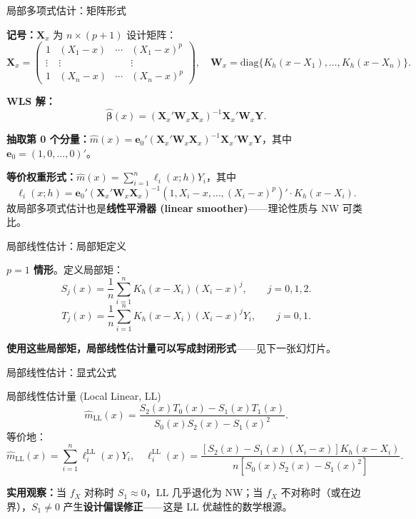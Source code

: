 \documentclass[aspectratio=169, 10pt]{beamer}
\begin{document}
\begin{frame}{局部多项式估计：矩阵形式}

  \textbf{记号：}$\mathbf{X}_x$ 为 $n\times(p+1)$ 设计矩阵：
  \[
    \mathbf{X}_x = \begin{pmatrix}
      1 & (X_1-x) & \cdots & (X_1-x)^p \\
      \vdots & \vdots & & \vdots \\
      1 & (X_n-x) & \cdots & (X_n-x)^p
    \end{pmatrix},\quad
    \mathbf{W}_x = \text{diag}\{K_h(x-X_1),\ldots,K_h(x-X_n)\}.
  \]

  \textbf{WLS 解：}
  \[
    \boxed{\;\hat{\boldsymbol{\beta}}(x) = (\mathbf{X}_x'\mathbf{W}_x \mathbf{X}_x)^{-1}\mathbf{X}_x'\mathbf{W}_x \mathbf{Y}.\;}
  \]

  \textbf{抽取第 0 个分量：}$\hat m(x) = \mathbf{e}_0'(\mathbf{X}_x'\mathbf{W}_x \mathbf{X}_x)^{-1}\mathbf{X}_x'\mathbf{W}_x \mathbf{Y}$，其中 $\mathbf{e}_0 = (1,0,\ldots,0)'$。

  \begin{keybox}
    \textbf{等价权重形式：}$\hat m(x) = \sum_{i=1}^n \ell_i(x; h) Y_i$，其中
    \[
      \ell_i(x;h) = \mathbf{e}_0'(\mathbf{X}_x'\mathbf{W}_x \mathbf{X}_x)^{-1}(1, X_i-x, \ldots, (X_i-x)^p)'\cdot K_h(x-X_i).
    \]
    故局部多项式估计也是\textbf{线性平滑器 (linear smoother)}——理论性质与 NW 可类比。
  \end{keybox}

\end{frame}


\begin{frame}{局部线性估计：局部矩定义}

  \textbf{$p=1$ 情形}。定义局部矩：
  \[
    S_j(x) = \frac{1}{n}\sum_{i=1}^n K_h(x-X_i)(X_i-x)^j,\qquad j=0,1,2.
  \]
  \[
    T_j(x) = \frac{1}{n}\sum_{i=1}^n K_h(x-X_i)(X_i-x)^j Y_i,\qquad j=0,1.
  \]

  \textbf{使用这些局部矩，局部线性估计量可以写成封闭形式}——见下一张幻灯片。

\end{frame}


\begin{frame}{局部线性估计：显式公式}

  \begin{definitionbox}{{局部线性估计量 (Local Linear, LL)}}
    \[
      \hat m_{\text{LL}}(x) = \frac{S_2(x) T_0(x) - S_1(x) T_1(x)}{S_0(x) S_2(x) - S_1(x)^2}.
    \]
    等价地：
    \[
      \hat m_{\text{LL}}(x) = \sum_{i=1}^n \ell_i^{\text{LL}}(x) Y_i,\quad
      \ell_i^{\text{LL}}(x) = \frac{[S_2(x) - S_1(x)(X_i-x)] K_h(x-X_i)}{n[S_0(x) S_2(x) - S_1(x)^2]}.
    \]
  \end{definitionbox}

  \begin{keybox}
    \textbf{实用观察：}当 $f_X$ 对称时 $S_1 \approx 0$，LL 几乎退化为 NW；当 $f_X$ 不对称时（或在边界），$S_1 \ne 0$ 产生\textbf{设计偏误修正}——这是 LL 优越性的数学根源。
  \end{keybox}

\end{frame}
\end{document}
